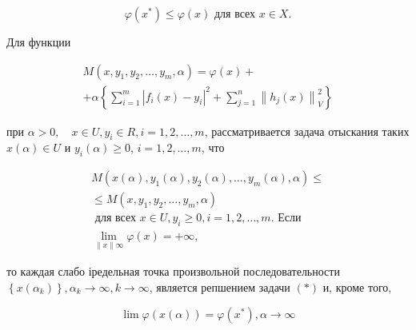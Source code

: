 \documentclass[10pt]{article}
\begin{document}
\[

\varphi\left(x^{*}\right) \leqslant \varphi(x) \text { для всех } x \in X .

\]



Для функции



\[

\begin{gathered}

M\left(x, y_{1}, y_{2}, \ldots, y_{m}, \alpha\right)=\varphi(x)+ \\

+\alpha\left\{\sum_{i=1}^{m}\left|f_{i}(x)-y_{i}\right|^{2}+\sum_{j=1}^{n}\left\|h_{j}(x)\right\|_{V}^{2}\right\}

\end{gathered}

\]



при $\alpha>0, \quad x \in U, y_{i} \in R, i=1,2, \ldots, m$, рассматривается задача отыскания таких $x(\alpha) \in U$ и $y_{i}(\alpha) \geqslant 0$, $i=1,2, \ldots, m$, что



\[

\begin{aligned}

M\left(x(\alpha), y_{1}(\alpha), y_{2}(\alpha), \ldots, y_{m}(\alpha), \alpha\right) \leqslant \\

\leqslant M\left(x, y_{1}, y_{2}, \ldots, y_{m}, \alpha\right) \\

\text { для всех } x \in U, y_{i} \geqslant 0, i=1,2, \ldots, m . \text { Если } \\

\lim _{\|x\| \infty} \varphi(x)=+\infty,

\end{aligned}

\]



то каждая слабо іредельная точка произвольной последовательности $\left\{x\left(\alpha_{k}\right)\right\}, \alpha_{k} \longrightarrow \infty, k \longrightarrow \infty$, является репшением задачи $(*)$ и, кроме того,



\[

\lim \varphi(x(\alpha))=\varphi\left(x^{*}\right), \alpha \longrightarrow \infty

\]
\end{document}
